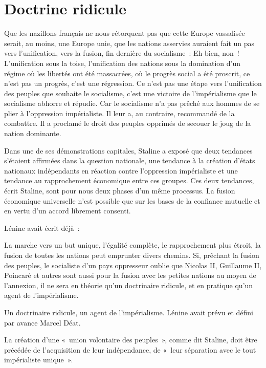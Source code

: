 \documentclass[french,twoside]{book} %
\newenvironment{quoteblock}%
  {\begin{quoting}}
  {\end{quoting}}
\newenvironment{quotebar}{%
    \def\FrameCommand{{\color{rubric!10!}\vrule width 0.5em} \hspace{0.9em}}%
    \def\OuterFrameSep{\itemsep} %
    \MakeFramed {\advance\hsize-\width \FrameRestore}
  }%
  {%
    \endMakeFramed
  }
\renewenvironment{quoteblock}%
  {%
    \savenotes
    \setstretch{0.9}
    \normalfont
    \begin{quotebar}
  }
  {%
    \end{quotebar}
    \spewnotes
  }
\begin{document}
\section[Doctrine ridicule]{Doctrine ridicule}
\noindent Que les nazillons français ne nous rétorquent pas que cette Europe vassalisée serait, au moins, une Europe unie, que les nations asservies auraient fait un pas vers l’unification, vers la fusion, fin dernière du socialisme : Eh bien, non ! L’unification sous la toise, l’unification des nations sous la domination d’un régime où les libertés ont été massacrées, où le progrès social a été proscrit, ce n’est pas un progrès, c’est une régression. Ce n’est pas une étape vers l’unification des peuples que souhaite le socialisme, c’est une victoire de l’impérialisme que le socialisme abhorre et répudie. Car le socialisme n’a pas prêché aux hommes de se plier à l’oppression impérialiste. Il leur a, au contraire, recommandé de la combattre. Il a proclamé le droit des peuples opprimés de secouer le joug de la nation dominante.\par
Dans une de ses démonstrations capitales, Staline a exposé que deux tendances s’étaient affirmées dans la question nationale, une tendance à la création d’états nationaux indépendants en réaction contre l’oppression impérialiste et une tendance au rapprochement économique entre ces groupes. Ces deux tendances, écrit Staline, sont pour nous deux phases d’un même processus. La fusion économique universelle n’est possible que sur les bases de la confiance mutuelle et en vertu d’un accord librement consenti.\par
Lénine avait écrit déjà :\par

\begin{quoteblock}
 \noindent La marche vers un but unique, l’égalité complète, le rapprochement plus étroit, la fusion de toutes les nations peut emprunter divers chemins. Si, prêchant la fusion des peuples, le socialiste d’un pays oppresseur oublie que Nicolas II, Guillaume II, Poincaré et autres sont aussi pour la fusion avec les petites nations au moyen de l’annexion, il ne sera en théorie qu’un doctrinaire ridicule, et en pratique qu’un agent de l’impérialisme.
 \end{quoteblock}

\noindent Un doctrinaire ridicule, un agent de l’impérialisme. Lénine avait prévu et défini par avance Marcel Déat.\par
La création d’une « union volontaire des peuples », comme dit Staline, doit être précédée de l’acquisition de leur indépendance, de « leur séparation avec le tout impérialiste unique ».
\end{document}
